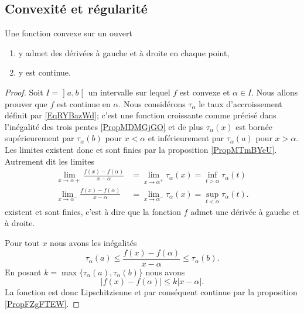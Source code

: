 \subsection{Convexité et régularité}

\begin{lemma}   \label{LemKLTsHIQ}
    Une fonction convexe sur un ouvert
    \begin{enumerate}
        \item
            y admet des dérivées à gauche et à droite en chaque point,
        \item
            y est continue.
    \end{enumerate}
\end{lemma}

\begin{proof}
    Soit \( I=\mathopen] a , b \mathclose[\) un intervalle sur lequel \( f\) est convexe et \( \alpha\in I\). Nous allons prouver que \( f\) est continue en \( \alpha\). Nous considérons \( \tau_{\alpha}\) le taux d'accroissement définit par \eqref{EqRYBazWd}; c'est une fonction croissante comme précisé dans l'inégalité des trois pentes \ref{PropMDMGjGO} et de plus \( \tau_{\alpha}(x)\) est bornée supérieurement par \( \tau_{\alpha}(b)\) pour \( x<\alpha\) et inférieurement par \( \tau_{\alpha}(a)\) pour \( x>\alpha\). Les limites existent donc et sont finies par la proposition \ref{PropMTmBYeU}. Autrement dit les limites
        \begin{subequations}
            \begin{align}
                \lim_{x\to \alpha+} \frac{ f(x)-f(\alpha) }{ x-\alpha }&=\lim_{x\to \alpha^+} \tau_{\alpha}(x)=\inf_{t>\alpha}\tau_{\alpha}(t)\\
                \lim_{x\to \alpha^-} \frac{ f(x)-f(\alpha) }{ x-\alpha }&=\lim_{x\to \alpha^-} \tau_{\alpha}(x)=\sup_{t<\alpha}\tau_{\alpha}(t).
            \end{align}
        \end{subequations}
        existent et sont finies, c'est à dire que la fonction \( f\) admet une dérivée à gauche et à droite.

        Pour tout \( x\) nous avons les inégalités
        \begin{equation}
            \tau_{\alpha}(a)\leq \frac{ f(x)-f(\alpha) }{ x-\alpha }\leq \tau_{\alpha}(b).
        \end{equation}
        En posant \( k=\max\{ \tau_{\alpha}(a),\tau_{\alpha}(b) \}\) nous avons
        \begin{equation}
            \big| f(x)-f(\alpha) \big|\leq k| x-\alpha |.
        \end{equation}
        La fonction est donc Lipschitzienne et par conséquent continue par la proposition \ref{PropFZgFTEW}.
\end{proof}

